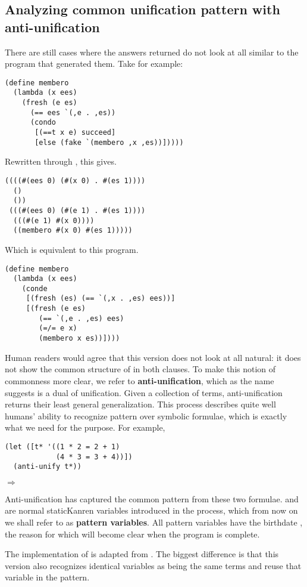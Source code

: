 \subsection{Analyzing common unification pattern with anti-unification}\label{au}
There are still cases where the answers returned do not look at all similar to the program that generated them. Take  for example:
\begin{lstlisting}
(define membero
  (lambda (x ees)
    (fresh (e es)
      (== ees `(,e . ,es))
      (condo
       [(==t x e) succeed]
       [else (fake `(membero ,x ,es))]))))
\end{lstlisting}

Rewritten through , this gives.
\begin{lstlisting}
((((#(ees 0) (#(x 0) . #(es 1)))) 
  ()
  ())
 (((#(ees 0) (#(e 1) . #(es 1))))
  (((#(e 1) #(x 0))))
  ((membero #(x 0) #(es 1)))))
\end{lstlisting}
Which is equivalent to this program.
\begin{lstlisting}
(define membero
  (lambda (x ees)
    (conde
     [(fresh (es) (== `(,x . ,es) ees))]
     [(fresh (e es)
        (== `(,e . ,es) ees)
        (=/= e x)
        (membero x es))])))
\end{lstlisting}
Human readers would agree that this version does not look at all natural: it does not show the common structure of  in both clauses. To make this notion of commonness more clear, we refer to \textbf{anti-unification}, which as the name suggests is a dual of unification. Given a collection of terms, anti-unification returns their least general generalization. This process describes quite well humans' ability to recognize pattern over symbolic formulae, which is exactly what we need for the purpose. For example,
\begin{lstlisting}
(let ([t* '((1 * 2 = 2 + 1)
            (4 * 3 = 3 + 4))])
  (anti-unify t*))
\end{lstlisting}
$\Rightarrow$ 

Anti-unification has captured the common pattern from these two formulae.  and  are normal staticKanren variables introduced in the process, which from now on we shall refer to as \textbf{pattern variables}. All pattern variables have the birthdate , the reason for which will become clear when the program is complete.

The implementation of  is adapted from \textcite{ostvold2004functional}. The biggest difference is that this version also recognizes identical variables as being the same terms and reuse that variable in the pattern. 

